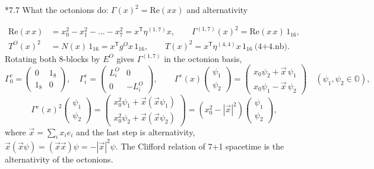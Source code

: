 \documentclass[10pt,a4paper]{article}
\makeatletter
\renewcommand\subsection{\@startsection{subsection}{2}{\z@}{-3.25ex\@plus -1ex \@minus -.2ex}{1.5ex \@plus .2ex}{\normalfont\large\bfseries\raggedright}}
\makeatother
\begin{document}
\subsection*{7.7 What the octonions do: \texorpdfstring{$\Gamma(x)^2=\mathrm{Re}(xx)$}{Γ(x)2=Re(xx)} and alternativity}
\begin{align*}
\mathrm{Re}(x\,x)&=x_0^2-x_1^2-\dots-x_7^2=x^{\mathsf T}\eta^{(1,7)}x,\qquad \Gamma^{(1,7)}(x)^2=\mathrm{Re}(x\,x)\,1_{16}, \\
T^{O}(x)^2&=N(x)\,1_{16}=x^{\mathsf T}g^{O}x\,1_{16},\qquad T(x)^2=x^{\mathsf T}\eta^{(4,4)}x\,1_{16}\ \text{(4+4.nb)}.
\end{align*}
Rotating both 8-blocks by $E^{O}$ gives $\Gamma^{(1,7)}$ in the octonion basis,
\begin{equation*}
\Gamma^{e}_0=\begin{pmatrix}0&1_8\\1_8&0\end{pmatrix},\quad \Gamma^{e}_i=\begin{pmatrix}L^{O}_i&0\\0&-L^{O}_i\end{pmatrix},\qquad \Gamma^{e}(x)\begin{pmatrix}\psi_1\\ \psi_2\end{pmatrix}=\begin{pmatrix}x_0\psi_2+\vec x\,\psi_1\\ x_0\psi_1-\vec x\,\psi_2\end{pmatrix}\quad(\psi_1,\psi_2\in\mathbb O),
\end{equation*}
\begin{equation*}
\Gamma^{e}(x)^2\begin{pmatrix}\psi_1\\ \psi_2\end{pmatrix}=\begin{pmatrix}x_0^2\psi_1+\vec x(\vec x\psi_1)\\ x_0^2\psi_2+\vec x(\vec x\psi_2)\end{pmatrix}=(x_0^2-|\vec x|^2)\begin{pmatrix}\psi_1\\ \psi_2\end{pmatrix},
\end{equation*}
where $\vec x=\sum_{i}x_ie_i$ and the last step is alternativity, $\vec x(\vec x\psi)=(\vec x\vec x)\psi=-|\vec x|^2\psi$. The Clifford relation of 7+1 spacetime is the alternativity of the octonions.
\end{document}
